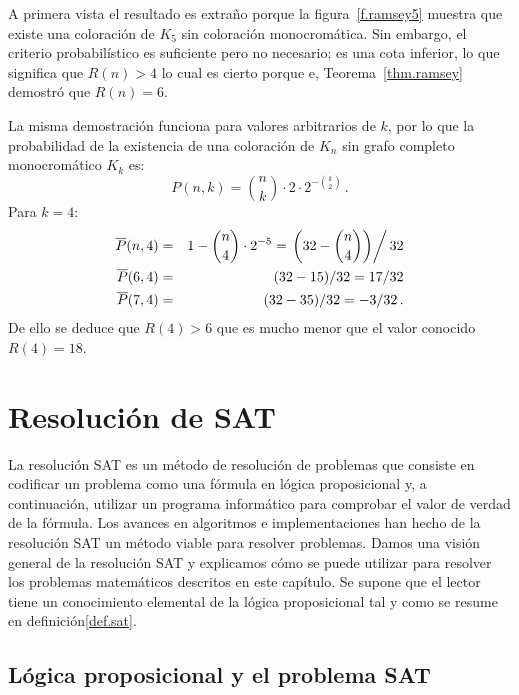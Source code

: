A primera vista el resultado es extraño porque la figura~\ref{f.ramsey5} muestra que existe una coloración de $K_5$ sin coloración monocromática. Sin embargo, el criterio probabilístico es suficiente pero no necesario; es una cota inferior, lo que significa que $R(n)>4$ lo cual es cierto porque e, Teorema~\ref{thm.ramsey} demostró que $R(n)=6$.

La misma demostración funciona para valores arbitrarios de $k$, por lo que la probabilidad de la existencia de una coloración de $K_n$ sin grafo completo monocromático $K_k$ es:
\[
P(n,k)=\binom{n}{k}\cdot 2\cdot 2^{-\binom{k}{2}}\,.
\]
Para $k=4$:
\begin{eqnarray*}
\overline{P}(n,4)&=&1-\binom{n}{4}\cdot 2^{-5}=\left.\left(32-\binom{n}{4}\right)\right/32\\
\overline{P}(6,4)&=&(32-15)/32=17/32\\
\overline{P}(7,4)&=&(32-35)/32=-3/32\,.
\end{eqnarray*}
De ello se deduce que $R(4)>6$ que es mucho menor que el valor conocido $R(4)=18$.


\section{Resolución de SAT}\label{s.sat}

La resolución SAT es un método de resolución de problemas que consiste en codificar un problema como una fórmula en lógica proposicional y, a continuación, utilizar un programa informático para comprobar el valor de verdad de la fórmula. Los avances en algoritmos e implementaciones han hecho de la resolución SAT un método viable para resolver problemas. Damos una visión general de la resolución SAT y explicamos cómo se puede utilizar para resolver los problemas matemáticos descritos en este capítulo. Se supone que el lector tiene un conocimiento elemental de la lógica proposicional tal y como se resume en definición\ref{def.sat}.

\subsection{Lógica proposicional y el problema SAT}

